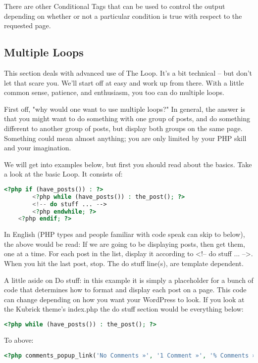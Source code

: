 There are other Conditional Tags that can be used to control the output depending on whether or not a particular condition is true with respect to the requested page.

\subsection{Multiple Loops}

This section deals with advanced use of The Loop. It's a bit technical – but don’t let that scare you. We’ll start off at easy and work up from there. With a little common sense, patience, and enthusiasm, you too can do multiple loops.

First off, "why would one want to use multiple loops?" In general, the answer is that you might want to do something with one group of posts, and do something different to another group of posts, but display both groups on the same page. Something could mean almost anything; you are only limited by your PHP skill and your imagination.

We will get into examples below, but first you should read about the basics. Take a look at the basic Loop. It consists of:

\begin{lstlisting}[language=PHP]
	<?php if (have_posts()) : ?>
		<?php while (have_posts()) : the_post(); ?>    
		<!-- do stuff ... -->
		<?php endwhile; ?>
	<?php endif; ?>
\end{lstlisting}

In English (PHP types and people familiar with code speak can skip to below), the above would be read: If we are going to be displaying posts, then get them, one at a time. For each post in the list, display it according to <!-- do stuff ... -->. When you hit the last post, stop. The do stuff line(s), are template dependent.

A little aside on Do stuff: in this example it is simply a placeholder for a bunch of code that determines how to format and display each post on a page. This code can change depending on how you want your WordPress to look. If you look at the Kubrick theme’s index.php the do stuff section would be everything below:

\begin{lstlisting}[language=PHP]
	<?php while (have_posts()) : the_post(); ?>
\end{lstlisting}

To above:

\begin{lstlisting}[language=PHP]
	<?php comments_popup_link('No Comments »', '1 Comment »', '% Comments »'); ?>
\end{lstlisting}

